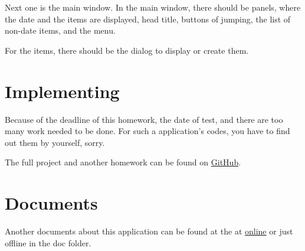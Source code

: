 \documentclass{article}
\begin{document}
Next one is the main window. In the main window, there should be panels, where the date and the items are displayed, head title, buttons of jumping,
the list of non-date items, and the menu.

For the items, there should be the dialog to display or create them.

\section{Implementing}
\label{sec:implement}

Because of the deadline of this homework, the date of test, and there are too many work needed to be done. For such a application's codes, you have to
find out them by yourself, sorry.

The full project and another homework can be found on \href{https://github.com/Qinka/Java-Homework}{GitHub}.

\section{Documents}
\label{sec:doc}

Another documents about this application can be found at the at \href{}{online} or just offline in the doc folder.
\end{document}
